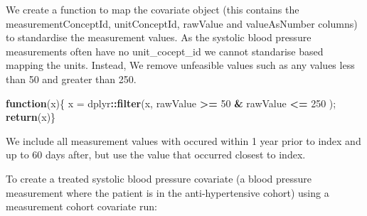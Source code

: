 \documentclass[
]{article}
\newenvironment{Shaded}{\begin{snugshade}}{\end{snugshade}}
\newcommand{\ControlFlowTok}[1]{\textcolor[rgb]{0.13,0.29,0.53}{\textbf{#1}}}
\newcommand{\DecValTok}[1]{\textcolor[rgb]{0.00,0.00,0.81}{#1}}
\newcommand{\KeywordTok}[1]{\textcolor[rgb]{0.13,0.29,0.53}{\textbf{#1}}}
\newcommand{\NormalTok}[1]{#1}
\newcommand{\OperatorTok}[1]{\textcolor[rgb]{0.81,0.36,0.00}{\textbf{#1}}}
\newcommand{\StringTok}[1]{\textcolor[rgb]{0.31,0.60,0.02}{#1}}
\begin{document}
We create a function to map the covariate object (this contains the
measurementConceptId, unitConceptId, rawValue and valueAsNumber columns)
to standardise the measurement values. As the systolic blood pressure
measurements often have no unit\_cocept\_id we cannot standarise based
mapping the units. Instead, We remove unfeasible values such as any
values less than 50 and greater than 250.

\begin{Shaded}
\begin{Highlighting}[]
\ControlFlowTok{function}\NormalTok{(x)\{ x =}\StringTok{ }\NormalTok{dplyr}\OperatorTok{::}\KeywordTok{filter}\NormalTok{(x, rawValue }\OperatorTok{>=}\StringTok{ }\DecValTok{50} \OperatorTok{&}\StringTok{ }\NormalTok{rawValue }\OperatorTok{<=}\StringTok{ }\DecValTok{250}\NormalTok{ ); }\KeywordTok{return}\NormalTok{(x)\}}
\end{Highlighting}
\end{Shaded}

We include all measurement values with occured within 1 year prior to
index and up to 60 days after, but use the value that occurred closest
to index.

To create a treated systolic blood pressure covariate (a blood pressure
measurement where the patient is in the anti-hypertensive cohort) using
a measurement cohort covariate run:
\end{document}
